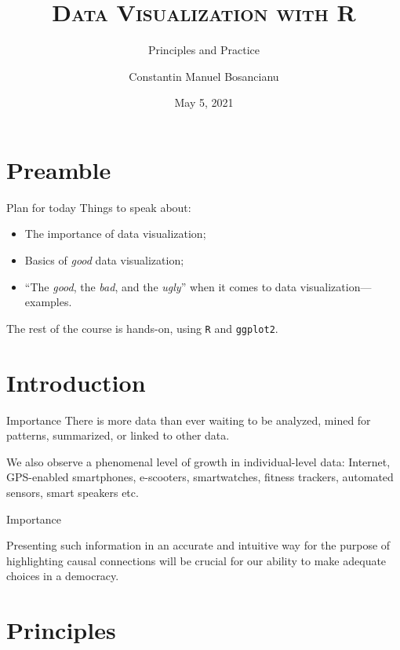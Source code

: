 \documentclass[12pt,english,pdf,dvipsnames,handout]{beamer}
\title{\textsc{Data Visualization with R}}
\subtitle{Principles and Practice}
\author{Constantin Manuel Bosancianu}
\institute{Wissenschaftszentrum Berlin \\ \textit{Institutions and Political Inequality} \\\href{mailto:bosancianu@icloud.com}{bosancianu@icloud.com}}
\date{May 5, 2021}
\begin{document}
\maketitle

\section{Preamble}

\begin{frame}{Plan for today}
  Things to speak about:

  \begin{itemize}
  \item The importance of data visualization;
  \item Basics of \textit{good} data visualization;
  \item ``The \textit{good}, the \textit{bad}, and the \textit{ugly}'' when it comes to data visualization---examples.
  \end{itemize}

  \bigskip
The rest of the course is hands-on, using \texttt{R} and \texttt{ggplot2}.
  
\end{frame}


\section{Introduction}

\begin{frame}{Importance}
There is more data than ever waiting to be analyzed, mined for patterns, summarized, or linked to other data.\bigskip

\pause

We also observe a phenomenal level of growth in individual-level data: Internet, GPS-enabled smartphones, e-scooters, smartwatches, fitness trackers, automated sensors, smart speakers etc.
  
\end{frame}


\begin{frame}{Importance}

Presenting such information in an accurate and intuitive way for the purpose of highlighting causal connections will be crucial for our ability to make adequate choices in a democracy.
  
\end{frame}




\section{Principles}
\end{document}
